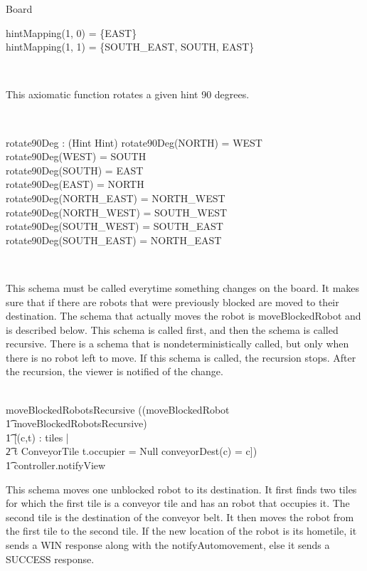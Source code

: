 \documentclass[12pt]{article}
\begin{document}
\begin{class}{Board}
\begin{axdef}
hintMapping(1, 0) = \{EAST\} \\
hintMapping(1, 1) = \{SOUTH\_EAST, SOUTH, EAST\} \\
\end{axdef} \\
\begin{zpar}
This axiomatic function rotates a given hint 90 degrees.
\end{zpar} \\
\begin{axdef}
rotate90Deg : \power (Hint \fun Hint)
\where
rotate90Deg(NORTH) = WEST \\
rotate90Deg(WEST) = SOUTH \\
rotate90Deg(SOUTH) = EAST \\
rotate90Deg(EAST) = NORTH \\
rotate90Deg(NORTH\_EAST) = NORTH\_WEST \\
rotate90Deg(NORTH\_WEST) = SOUTH\_WEST \\
rotate90Deg(SOUTH\_WEST) = SOUTH\_EAST \\
rotate90Deg(SOUTH\_EAST) = NORTH\_EAST
\end{axdef} \\
\znewpage
\begin{zpar}
This schema must be called everytime something changes on the board. It makes sure that if there are robots that were previously blocked are moved to their destination. The schema that actually moves the robot is moveBlockedRobot and is described below. This schema is called first, and then the schema is called recursive. There is a schema that is nondeterministically called, but only when there is no robot left to move. If this schema is called, the recursion stops. After the recursion, the viewer is notified of the change.
\end{zpar} \\
moveBlockedRobotsRecursive \sdef ((moveBlockedRobot \; \; \comp \\ \t1 moveBlockedRobotsRecursive) \; \; [] \\ \t1 [\neg \exists (c,t) : tiles | \\ \t2 t \in ConveyorTile \wedge t.occupier \not = Null \wedge conveyorDest(c) = c]) \; \; \comp \\ \t1 controller.notifyView \\
\also \also \also
\begin{zpar}
This schema moves one unblocked robot to its destination. It first finds two tiles for which the first tile is a conveyor tile and has an robot that occupies it. The second tile is the destination of the conveyor belt. It then moves the robot from the first tile to the second tile. If the new location of the robot is its hometile, it sends a WIN response along with the notifyAutomovement, else it sends a SUCCESS response.

\end{zpar}
\end{class}
\end{document}

